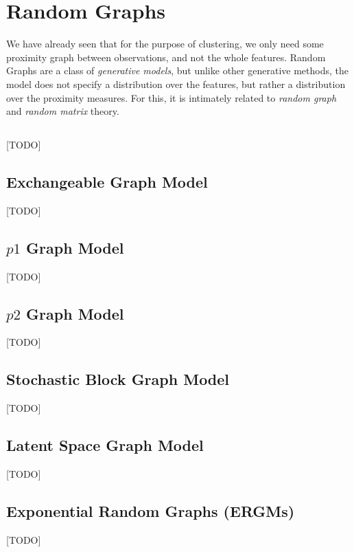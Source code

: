 \section{Random Graphs}
\label{sec:random_graphs}

We have already seen that for the purpose of clustering, we only need some proximity graph between observations, and not the whole features. 
Random Graphs are a class of \emph{generative models}, but unlike other generative methods, the model does not specify a distribution over the features, but rather a distribution over the proximity measures.
For this, it is  intimately related to \emph{random graph} and \emph{random matrix} theory.


\subsection{\erdos \renyi}
[TODO]

\subsection{Exchangeable Graph Model}
[TODO]

\subsection{$p1$ Graph Model}
[TODO]

\subsection{$p2$ Graph Model}
[TODO]

\subsection{Stochastic Block Graph Model}
[TODO]

\subsection{Latent Space Graph Model}
[TODO]

\subsection{Exponential Random Graphs (ERGMs)}
[TODO]

\begin{remark}
\end{remark}

